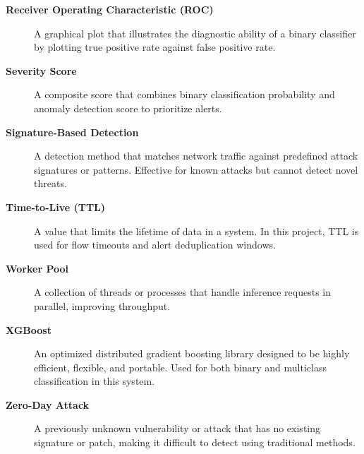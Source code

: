 \documentclass[12pt,a4paper]{report}
\begin{document}
\begin{description}
    \item[\textbf{Receiver Operating Characteristic (ROC)}] A graphical plot that illustrates the diagnostic ability of a binary classifier by plotting true positive rate against false positive rate.

    \item[\textbf{Severity Score}] A composite score that combines binary classification probability and anomaly detection score to prioritize alerts.

    \item[\textbf{Signature-Based Detection}] A detection method that matches network traffic against predefined attack signatures or patterns. Effective for known attacks but cannot detect novel threats.

    \item[\textbf{Time-to-Live (TTL)}] A value that limits the lifetime of data in a system. In this project, TTL is used for flow timeouts and alert deduplication windows.

    \item[\textbf{Worker Pool}] A collection of threads or processes that handle inference requests in parallel, improving throughput.

    \item[\textbf{XGBoost}] An optimized distributed gradient boosting library designed to be highly efficient, flexible, and portable. Used for both binary and multiclass classification in this system.

    \item[\textbf{Zero-Day Attack}] A previously unknown vulnerability or attack that has no existing signature or patch, making it difficult to detect using traditional methods.

\end{description}
\end{document}
